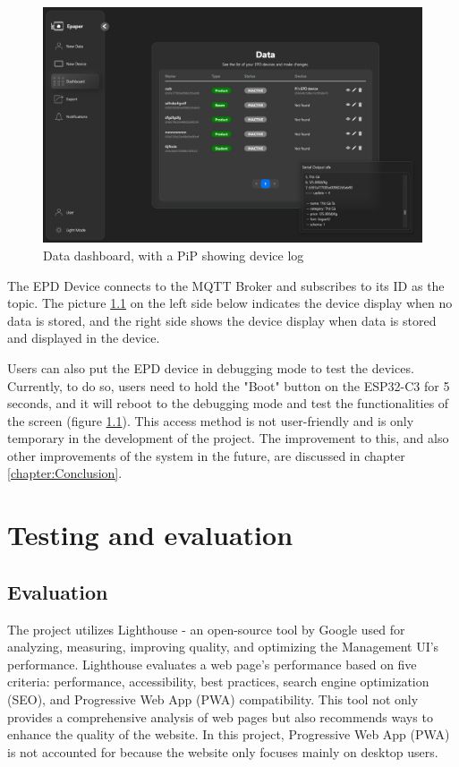 \documentclass[../Main.tex]{subfiles}
\begin{document}
\begin{figure}[H]
        \centering
        \includegraphics[width=0.87\linewidth]{doc//imgs/ui_data-dashboard.png}
        \caption{Data dashboard, with a PiP showing device log}
        \label{fig:data-dashboard}
\end{figure}

The \gls{EPD} Device connects to the MQTT Broker and subscribes to its ID as the topic. The picture \ref{} on the left side below indicates the device display when no data is stored, and the right side shows the device display when data is stored and displayed in the device. 

Users can also put the \gls{EPD} device in debugging mode to test the devices. Currently, to do so, users need to hold the "Boot" button on the ESP32-C3 for 5 seconds, and it will reboot to the debugging mode and test the functionalities of the screen (figure \ref{}). This access method is not user-friendly and is only temporary in the development of the project. The improvement to this, and also other improvements of the system in the future, are discussed in chapter \ref{chapter:Conclusion}.

\section{Testing and evaluation}
\subsection{Evaluation}
The project utilizes Lighthouse - an open-source tool by Google used for analyzing, measuring, improving quality, and optimizing the Management UI's performance. Lighthouse evaluates a web page's performance based on five criteria: performance, accessibility, best practices, search engine optimization (SEO), and Progressive Web App (PWA) compatibility\cite{lighthouse}. This tool not only provides a comprehensive analysis of web pages but also recommends ways to enhance the quality of the website. In this project, Progressive Web App (PWA) is not accounted for because the website only focuses mainly on desktop users. 
\end{document}
